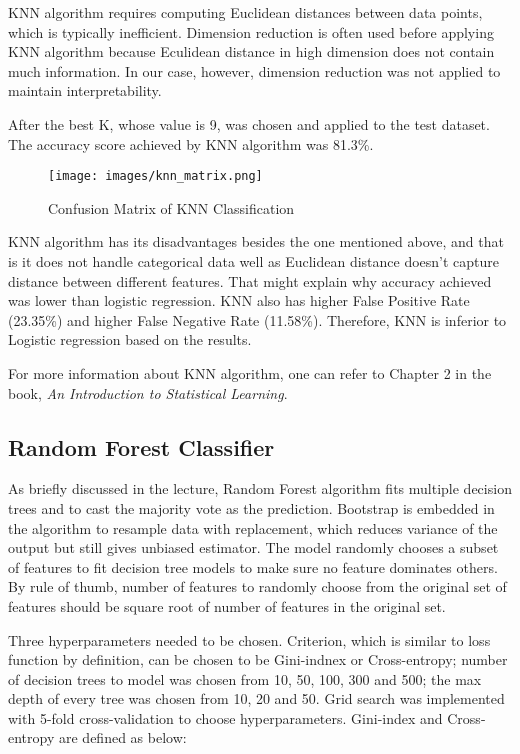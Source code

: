 \documentclass[letterpaper, 10 pt, conference]{ieeeconf}  %
\begin{document}
KNN algorithm requires computing Euclidean distances between data points, which is typically inefficient. Dimension reduction is often used before applying KNN algorithm because Eculidean distance in high dimension does not contain much information. In our case, however, dimension reduction was not applied to maintain interpretability.

After the best K, whose value is 9, was chosen and applied to the test dataset. The accuracy score achieved by KNN algorithm was 81.3\%.

\begin{figure}[H]
    \centering
    \texttt{[image: images/knn\_matrix.png]}
    \caption{Confusion Matrix of KNN Classification}
\end{figure}

KNN algorithm has its disadvantages besides the one mentioned above, and that is it does not handle categorical data well as Euclidean distance doesn't capture distance between different features. That might explain why accuracy achieved was lower than logistic regression. KNN also has higher False Positive Rate (23.35\%) and higher False Negative Rate (11.58\%). Therefore, KNN is inferior to Logistic regression based on the results.

For more information about KNN algorithm, one can refer to Chapter 2 in the book, \textit{An Introduction to Statistical Learning}\cite{c1}.

\subsection{Random Forest Classifier}
As briefly discussed in the lecture, Random Forest algorithm fits multiple decision trees and to cast the majority vote as the prediction. Bootstrap is embedded in the algorithm to resample data with replacement, which reduces variance of the output but still gives unbiased estimator. The model randomly chooses a subset of features to fit decision tree models to make sure no feature dominates others. By rule of thumb, number of features to randomly choose from the original set of features should be square root of number of features in the original set\cite{c3}.

Three hyperparameters needed to be chosen. Criterion, which is similar to loss function by definition, can be chosen to be Gini-indnex or Cross-entropy; number of decision trees to model was chosen from 10, 50, 100, 300 and 500; the max depth of every tree was chosen from 10, 20 and 50. Grid search was implemented with 5-fold cross-validation to choose hyperparameters. Gini-index and Cross-entropy are defined as below:
\end{document}
